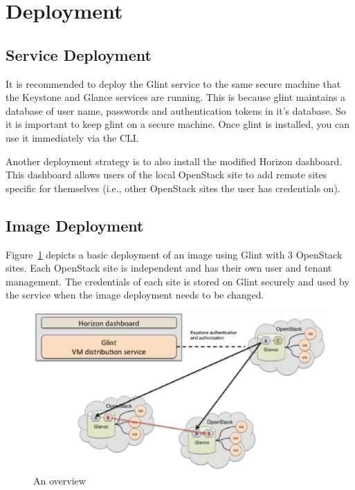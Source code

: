 \documentclass[a4paper]{jpconf}
\begin{document}
\section{Deployment}

\subsection{Service Deployment}
It is recommended to deploy the Glint service to the same secure machine that the Keystone and Glance services are running. This is because glint maintains a database of user name, passwords and authentication tokens in it's database. So it is important to keep glint on a secure machine. Once glint is installed, you can use it immediately via the CLI.

Another deployment strategy is to also install the modified Horizon dashboard. This dashboard allows users of the local OpenStack site to add remote sites specific for themselves (i.e., other OpenStack sites the user has credentials on).  

\subsection{Image Deployment}
Figure~\ref{fig:glintfigure} depicts a basic deployment of an image using Glint with 3 OpenStack sites. Each OpenStack site is independent and has their own user and tenant management. The credentials of each site is stored on Glint securely and used by the service when the image deployment needs to be changed.

\begin{figure}[ht]
\begin{center}
\includegraphics[width=36pc]{GlintFigure.eps}
\caption{\label{fig:glintfigure}An overview }
\end{center}
\end{figure}
\end{document}
